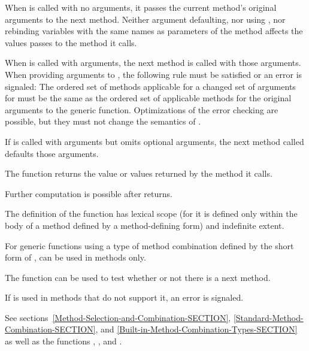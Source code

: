 \begin{defun}[Function]
When  is called with no arguments, it passes the
current method's original arguments to the next method.  Neither
argument defaulting, nor using , nor rebinding variables
with the same names as parameters of the method affects the values
 passes to the method it calls.

When  is called with arguments, the next method
is called with those arguments.  When providing arguments to 
, the following rule must be satisfied or an error is
signaled: The ordered set of methods applicable for a changed set of
arguments for  must be the same as the ordered set of
applicable methods for the original arguments to the generic function.
Optimizations of the error checking are possible, but they must 
not change the semantics of .

If  is called with arguments but omits
optional arguments, the next method called defaults those arguments.

The function  returns the value or values
returned by the method it calls.  

Further computation is possible after  returns.

The definition of the function  has lexical scope (for it
is defined only within the body of a method defined by a method-defining form)
and indefinite extent.

For generic functions using a type of method combination defined by
the short form of , 
 can be used in  methods only.

The function  can be used to test whether or not there is
a next method.

If  is used in methods that do not support it,
an error is signaled.

See sections~\ref{Method-Selection-and-Combination-SECTION},
\ref{Standard-Method-Combination-SECTION}, and
\ref{Built-in-Method-Combination-Types-SECTION} as well as the functions
,
,
and .
\end{defun}


